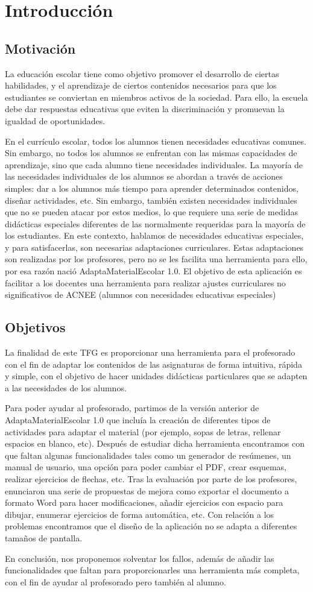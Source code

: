 \chapter{Introducción}
\label{cap:introduccion}

\section{Motivación}
La educación escolar tiene como objetivo promover el desarrollo de ciertas habilidades, y el aprendizaje de ciertos contenidos necesarios para que los estudiantes se conviertan en miembros activos de la sociedad. Para ello, la escuela debe dar respuestas educativas que eviten la discriminación y promuevan la igualdad de oportunidades.

En el currículo escolar, todos los alumnos tienen necesidades educativas comunes. Sin embargo, no todos los alumnos se enfrentan con las mismas capacidades de aprendizaje, sino que cada alumno tiene necesidades individuales. La mayoría de las necesidades individuales de los alumnos se abordan a través de acciones simples: dar a los alumnos más tiempo para aprender determinados contenidos, diseñar actividades, etc.  Sin embargo, también existen necesidades individuales que no se pueden atacar por estos medios, lo que requiere una serie de medidas didácticas especiales diferentes de las normalmente requeridas para la mayoría de los estudiantes. En este contexto, hablamos de necesidades educativas especiales, y para satisfacerlas, son necesarias adaptaciones curriculares.  Estas adaptaciones son realizadas por los profesores, pero no se les facilita una herramienta para ello, por esa razón nació AdaptaMaterialEscolar 1.0. El objetivo de esta aplicación es facilitar a los docentes una herramienta para realizar ajustes curriculares no significativos de ACNEE (alumnos con necesidades educativas especiales)

\section{Objetivos}
La finalidad de este TFG es proporcionar una herramienta para el profesorado con el fin de adaptar los contenidos de las asignaturas de forma intuitiva, rápida y simple, con el objetivo de hacer unidades didácticas particulares que se adapten a las necesidades de los alumnos.

Para poder ayudar al profesorado, partimos de la versión anterior de AdaptaMaterialEscolar 1.0 que incluía la creación de diferentes tipos de actividades para adaptar el material (por ejemplo, sopas de letras, rellenar espacios en blanco, etc). Después de estudiar dicha herramienta encontramos con que faltan algunas funcionalidades tales como un generador de resúmenes, un manual de usuario, una opción para poder cambiar el PDF, crear esquemas, realizar ejercicios de flechas, etc. Tras la evaluación por parte de los profesores, enunciaron una serie de propuestas de mejora como exportar el documento a formato Word para hacer modificaciones, añadir ejercicios con espacio para dibujar, enumerar ejercicios de forma automática, etc. Con relación a los problemas encontramos que el diseño de la aplicación no se adapta a diferentes tamaños de pantalla. 

En conclusión, nos proponemos solventar los fallos, además de añadir las funcionalidades que faltan para proporcionarles una herramienta más completa, con el fin de ayudar al profesorado pero también al alumno. 

